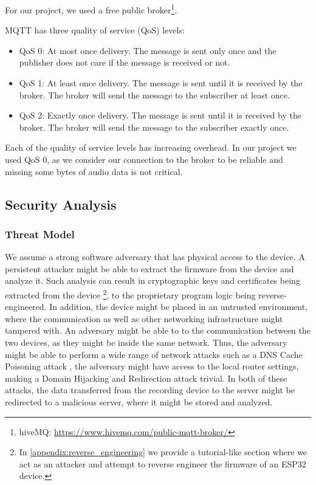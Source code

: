 \documentclass[conference]{IEEEtran}
\begin{document}
For our project, we used a free public broker\footnote{hiveMQ: \url{https://www.hivemq.com/public-mqtt-broker/}}.

MQTT has three quality of service (QoS) levels:

\begin{itemize}
    \item QoS 0: At most once delivery. The message is sent only once and the publisher does not care if the message is received or not.
    \item QoS 1: At least once delivery. The message is sent until it is received by the broker. The broker will send the message to the subscriber at least once.
    \item QoS 2: Exactly once delivery. The message is sent until it is received by the broker. The broker will send the message to the subscriber exactly once.
\end{itemize}

Each of the quality of service levels has increasing overhead. In our project
we used QoS 0, as we consider our connection to the broker to be reliable 
and missing some bytes of audio data is not critical.

\subsection{Security Analysis}
\label{subsec:security_analysis}


\subsubsection{Threat Model}

We assume a strong software adversary that has physical access to the device.
A persistent attacker might be able to extract the firmware from the device and
analyze it. Such analysis can result in cryptographic keys and certificates being extracted from the device
\footnote{In \cref{appendix:reverse_engineering} we provide a tutorial-like section where we act as an attacker and attempt to reverse engineer the firmware of an ESP32 device.}, 
to the proprietary program logic being reverse-engineered.
In addition, the device might be placed in an untrusted environment, where the communication as well 
as other networking infrastructure might tampered with.
An adversary might be able to  to the communication between the two devices,
as they might be inside the same network.
Thus, the adversary might be able to perform a wide range of network attacks such 
as a DNS Cache Poisoning attack \cite{Dissanayake_2018}, the adversary might have access to the local router 
settings, making a Domain Hijacking and Redirection attack \cite{DnsHijacking} trivial. In both of these attacks, 
the data transferred from the recording device to the server might be redirected to a malicious server, 
where it might be stored and analyzed.
\end{document}
